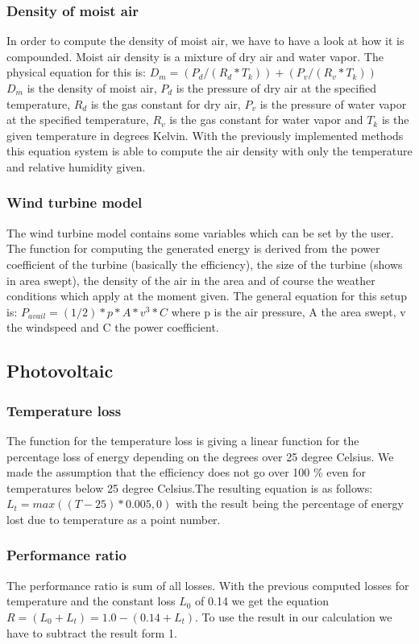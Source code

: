 \subsubsection{Density of moist air}
In order to compute the density of moist air, we have to have a look at how it is compounded. Moist air density is a mixture of dry air and water vapor. The physical equation for this is: $D_m = (P_d/(R_d * T_k))+(P_v/(R_v*T_k))$\\
$D_m$ is the density of moist air, $P_d$ is the pressure of dry air at the specified temperature, $R_d$ is the gas constant for dry air, $P_v$ is the pressure of water vapor at the specified temperature, $R_v$ is the gas constant for water vapor and $T_k$ is the given temperature in degrees Kelvin. With the previously implemented methods this equation system is able to compute the air density with only the temperature and relative humidity given.\cite{AirDensity,Shelquist}
\subsubsection{Wind turbine model}
The wind turbine model contains some variables which can be set by the user. The function for computing the generated energy is derived from the power coefficient of the turbine (basically the efficiency), the size of the turbine (shows in area swept), the density of the air in the area and of course the weather conditions which apply at the moment given.
The general equation for this setup is: $P_{avail} = (1/2) * p * A * v^{3} * C$
where p is the air pressure, A the area swept, v the windspeed and C the power coefficient. \cite{WindPowerCalcs}
\subsection{Photovoltaic}
\subsubsection{Temperature loss}
The function for the temperature loss is giving a linear function for the percentage loss of energy depending on the degrees over 25 degree Celsius. We made the assumption that the efficiency does not go over 100 \% even for temperatures below 25 degree Celsius.The resulting equation is as follows: $L_t = max((T-25)*0.005 , 0)$ with the result being the percentage of energy lost due to temperature as a point number.
\subsubsection{Performance ratio}
The performance ratio is sum of all losses.
With the previous computed losses for temperature and the constant loss $L_0$ of 0.14 we get the equation $R = (L_0 + L_t) = 1.0 - (0.14 + L_t)$. To use  the result in our calculation we have to subtract the result form 1.
